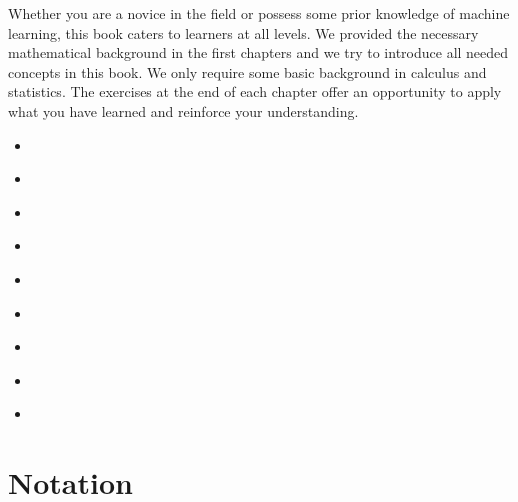 \documentclass[letterpaper,10pt,english]{jupyterBook}
\begin{document}
\sphinxAtStartPar
Whether you are a novice in the field or possess some prior knowledge of machine learning, this book caters to learners at all levels. We provided the necessary mathematical background in the first chapters and we try to introduce all needed concepts in this book. We only require some basic background in calculus and statistics. The exercises at the end of each chapter offer an opportunity to apply what you have learned and reinforce your understanding.
\begin{itemize}
\item {} 
\sphinxAtStartPar
{\hyperref[\detokenize{notation::doc}]{}}

\item {} 
\sphinxAtStartPar
{\hyperref[\detokenize{linalg::doc}]{}}

\item {} 
\sphinxAtStartPar
{\hyperref[\detokenize{optimization::doc}]{}}

\item {} 
\sphinxAtStartPar
{\hyperref[\detokenize{regression::doc}]{}}

\item {} 
\sphinxAtStartPar
{\hyperref[\detokenize{classification::doc}]{}}

\item {} 
\sphinxAtStartPar
{\hyperref[\detokenize{neuralnets::doc}]{}}

\item {} 
\sphinxAtStartPar
{\hyperref[\detokenize{dim_reduction::doc}]{}}

\item {} 
\sphinxAtStartPar
{\hyperref[\detokenize{clustering::doc}]{}}

\item {} 
\sphinxAtStartPar
{\hyperref[\detokenize{bibliography::doc}]{}}

\end{itemize}

\sphinxstepscope


\chapter{Notation}
\label{\detokenize{notation:notation}}\label{\detokenize{notation::doc}}
\end{document}
